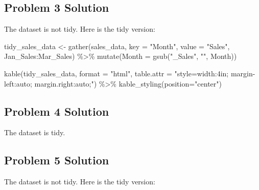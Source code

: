 \documentclass[
  letterpaper,
  DIV=11,
  numbers=noendperiod]{scrreprt}
\newenvironment{Shaded}{\begin{snugshade}}{\end{snugshade}}
\newcommand{\AttributeTok}[1]{\textcolor[rgb]{0.40,0.45,0.13}{#1}}
\newcommand{\FunctionTok}[1]{\textcolor[rgb]{0.28,0.35,0.67}{#1}}
\newcommand{\NormalTok}[1]{\textcolor[rgb]{0.00,0.23,0.31}{#1}}
\newcommand{\OtherTok}[1]{\textcolor[rgb]{0.00,0.23,0.31}{#1}}
\newcommand{\SpecialCharTok}[1]{\textcolor[rgb]{0.37,0.37,0.37}{#1}}
\newcommand{\StringTok}[1]{\textcolor[rgb]{0.13,0.47,0.30}{#1}}
\begin{document}
\subsection*{Problem 3 Solution}\label{problem-3-solution}

The dataset is not tidy. Here is the tidy version:

\begin{Shaded}
\begin{Highlighting}[]
\NormalTok{tidy\_sales\_data }\OtherTok{\textless{}{-}} \FunctionTok{gather}\NormalTok{(sales\_data, }\AttributeTok{key =} \StringTok{"Month"}\NormalTok{, }\AttributeTok{value =} \StringTok{"Sales"}\NormalTok{, Jan\_Sales}\SpecialCharTok{:}\NormalTok{Mar\_Sales) }\SpecialCharTok{\%\textgreater{}\%}
  \FunctionTok{mutate}\NormalTok{(}\AttributeTok{Month =} \FunctionTok{gsub}\NormalTok{(}\StringTok{"\_Sales"}\NormalTok{, }\StringTok{""}\NormalTok{, Month))}

\FunctionTok{kable}\NormalTok{(tidy\_sales\_data, }\AttributeTok{format =} \StringTok{"html"}\NormalTok{, }\AttributeTok{table.attr =} \StringTok{"style=\textquotesingle{}width:4in; margin{-}left:auto; margin.right:auto;\textquotesingle{}"}\NormalTok{)  }\SpecialCharTok{\%\textgreater{}\%}
  \FunctionTok{kable\_styling}\NormalTok{(}\AttributeTok{position=}\StringTok{"center"}\NormalTok{)}
\end{Highlighting}
\end{Shaded}

\subsection*{Problem 4 Solution}\label{problem-4-solution}

The dataset is tidy.

\subsection*{Problem 5 Solution}\label{problem-5-solution}

The dataset is not tidy. Here is the tidy version:
\end{document}
